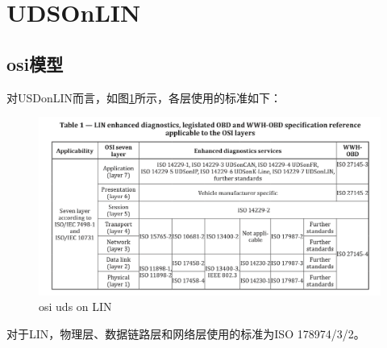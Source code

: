 \section{UDSOnLIN}
\subsection{osi模型}

对USDonLIN而言，如图\ref{fig:usd_onlin}所示，各层使用的标准如下：
\begin{figure}[ht]
    \centering
    \includegraphics[]{./pic/osi_uds_onlin.png}
    \caption{osi uds on LIN}
    \label{fig:usd_onlin}
\end{figure}

对于LIN，物理层、数据链路层和网络层使用的标准为ISO 178974/3/2。